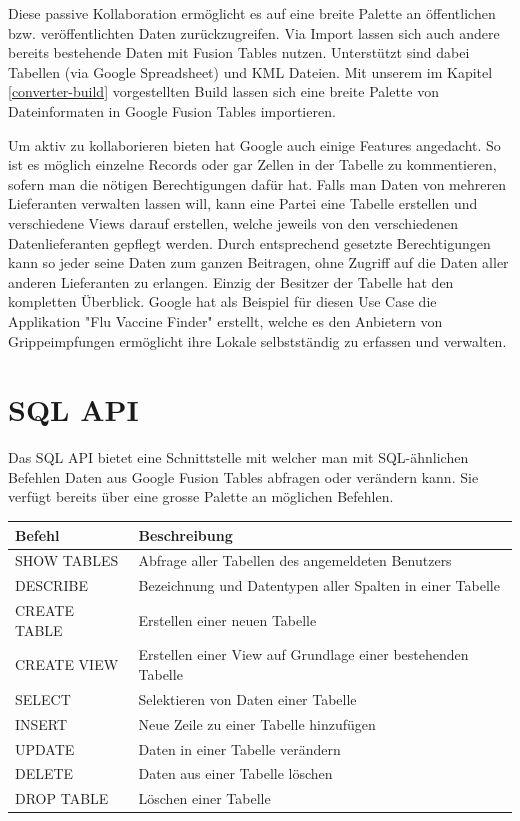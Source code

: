 Diese passive Kollaboration ermöglicht es auf eine breite Palette an öffentlichen bzw. veröffentlichten Daten zurückzugreifen. Via Import lassen sich auch andere bereits bestehende Daten mit Fusion Tables nutzen. Unterstützt sind dabei Tabellen (via Google Spreadsheet) und KML Dateien. Mit unserem im Kapitel \ref{converter-build} vorgestellten Build lassen sich eine breite Palette von Dateinformaten in Google Fusion Tables importieren.

Um aktiv zu kollaborieren bieten hat Google auch einige Features angedacht. So ist es möglich einzelne Records oder gar Zellen in der Tabelle zu kommentieren, sofern man die nötigen Berechtigungen dafür hat. Falls man Daten von mehreren Lieferanten verwalten lassen will, kann eine Partei eine Tabelle erstellen und verschiedene Views darauf erstellen, welche jeweils von den verschiedenen Datenlieferanten gepflegt werden. Durch entsprechend gesetzte Berechtigungen kann so jeder seine Daten zum ganzen Beitragen, ohne Zugriff auf die Daten aller anderen Lieferanten zu erlangen. Einzig der Besitzer der Tabelle hat den kompletten Überblick. Google hat als Beispiel für diesen Use Case die Applikation "Flu Vaccine Finder" erstellt, welche es den Anbietern von Grippeimpfungen ermöglicht ihre Lokale selbstständig zu erfassen und verwalten.\cite{data-gathering}


\section{SQL API}
\label{sql-api}
Das SQL API bietet eine Schnittstelle mit welcher man mit SQL-ähnlichen Befehlen Daten aus Google Fusion Tables abfragen oder verändern kann. Sie verfügt bereits über eine grosse Palette an möglichen Befehlen.

\begin{tabular}{|l|l|}
\hline 
Befehl & Beschreibung \\ 
\hline 
SHOW TABLES & Abfrage aller Tabellen des angemeldeten Benutzers \\ 
\hline 
DESCRIBE & Bezeichnung und Datentypen aller Spalten in einer Tabelle \\ 
\hline 
CREATE TABLE & Erstellen einer neuen Tabelle \\ 
\hline 
CREATE VIEW & Erstellen einer View auf Grundlage einer bestehenden Tabelle \\ 
\hline 
SELECT & Selektieren von Daten einer Tabelle \\ 
\hline 
INSERT & Neue Zeile zu einer Tabelle hinzufügen \\ 
\hline 
UPDATE & Daten in einer Tabelle verändern \\ 
\hline 
DELETE & Daten aus einer Tabelle löschen \\ 
\hline 
DROP TABLE & Löschen einer Tabelle \\ 
\hline 
\end{tabular}

